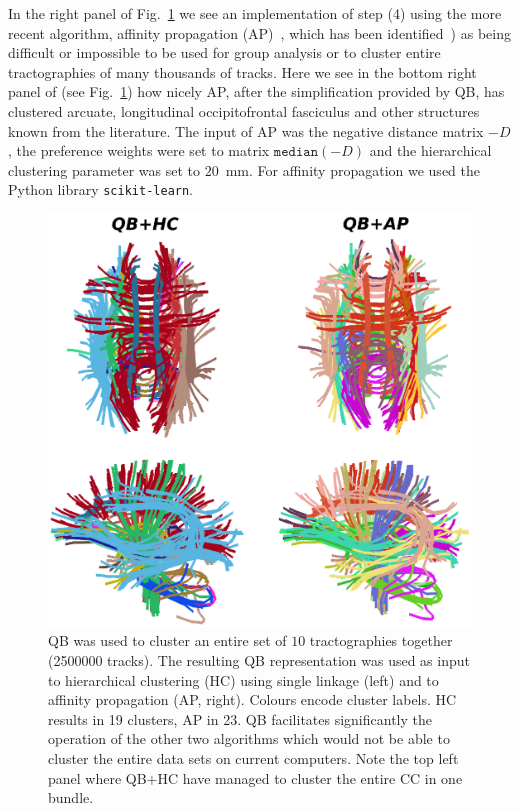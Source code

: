 \documentclass{bioinfo}
\begin{document}
In the right panel of Fig.~\ref{Flo:LSC+HC+AP} we see an implementation
of step (4) using the more recent algorithm, affinity propagation
(AP)~\cite{dueck2009affinity}, which has been
identified~\cite{malcolm2009filtered}) as being difficult or impossible
to be used for group analysis or to cluster entire tractographies of
many thousands of tracks.
Here we see in the bottom right panel of (see Fig.~\ref{Flo:LSC+HC+AP})
how nicely AP, after the simplification provided by QB, has clustered
arcuate, longitudinal occipitofrontal fasciculus and other structures
known from the literature. The input of AP was the negative distance
matrix $-D$, the preference weights were set to matrix $\mathtt{median}(-D)$
and the hierarchical clustering parameter was set to $20$~mm.
For affinity propagation we used the Python library \texttt{scikit-learn}.

\begin{figure}
\begin{centering}
\includegraphics[scale=0.6]{Figures/Fig_8_QB_with_others}
\par\end{centering}
\caption{QB was used to cluster an entire set of $10$ tractographies
  together (\num{2500000} tracks). The resulting QB representation was used as
  input to hierarchical clustering (HC) using single linkage (left)
  and to affinity propagation (AP, right). Colours encode cluster
  labels. HC results in 19 clusters, AP in 23. QB facilitates
  significantly the operation of the other two algorithms which would
  not be able to cluster the entire data sets on current computers. Note
  the top left panel where QB+HC have managed to cluster the entire CC
  in one bundle.\label{Flo:LSC+HC+AP}}
\end{figure}
\end{document}
